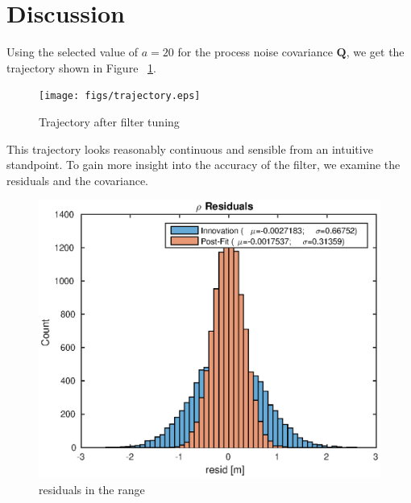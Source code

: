 \documentclass{article}
\begin{document}




\section{Discussion}

Using the selected value of $a=20$ for the process noise covariance $\mathbf{Q}$, we get the trajectory shown in Figure ~\ref{fig:trajectory}.

\begin{figure}[!htbp]
	\centering
	\texttt{[image: figs/trajectory.eps]}
	\caption{Trajectory after filter tuning}
	\label{fig:trajectory}
\end{figure}


This trajectory looks reasonably continuous and sensible from an intuitive standpoint. To gain more insight into the accuracy of the filter, we examine the residuals and the covariance.

\begin{figure}[!htbp]
	\centering
	\includegraphics[scale=0.7]{figs/resid_rho.eps}
	\caption{residuals in the range}
	\label{fig:resid_rho}
\end{figure}
\end{document}
